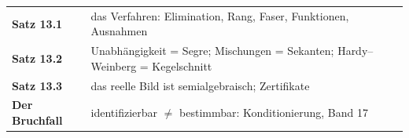 \begin{merksatz}
\begin{center}
\renewcommand{\arraystretch}{1.5}
\begin{tabular}{@{}P{3.0cm}P{5.6cm}@{}}
\toprule
\textbf{Satz 13.1} & das Verfahren: Elimination, Rang, Faser, Funktionen, Ausnahmen\\
\textbf{Satz 13.2} & Unabhängigkeit = Segre; Mischungen = Sekanten; Hardy--Weinberg = Kegelschnitt\\
\textbf{Satz 13.3} & das reelle Bild ist semialgebraisch; Zertifikate\\
\textbf{Der Bruchfall} & identifizierbar $\ne$ bestimmbar: Konditionierung, Band 17\\
\bottomrule
\end{tabular}
\end{center}

\begin{center}
\begin{minipage}{0.88\textwidth}
\end{minipage}
\end{center}
\end{merksatz}
